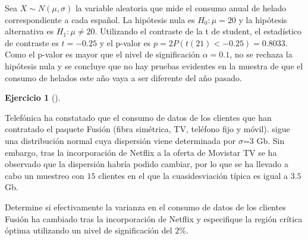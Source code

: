\documentclass[
  spanish,
  a4paper,
]{scrreport}
\theoremstyle{definition}
\newtheorem{exercise}{Ejercicio}[chapter]
\theoremstyle{remark}
\begin{document}
\begin{tcolorbox}[enhanced jigsaw, arc=.35mm, bottomrule=.15mm, bottomtitle=1mm, breakable, colback=white, colbacktitle=quarto-callout-tip-color!10!white, colframe=quarto-callout-tip-color-frame, coltitle=black, left=2mm, leftrule=.75mm, opacityback=0, opacitybacktitle=0.6, rightrule=.15mm, title=\textcolor{quarto-callout-tip-color}{\faLightbulb}\hspace{0.5em}{Solución}, titlerule=0mm, toprule=.15mm, toptitle=1mm]

Sea \(X\sim N(\mu,\sigma)\) la variable aleatoria que mide el consumo
anual de helado correspondiente a cada español. La hipótesis nula es
\(H_0: \mu=20\) y la hipótesis alternativa es \(H_1: \mu\neq 20\).
Utilizando el contraste de la t de student, el estadístico de contraste
es \(t=-0.25\) y el p-valor es \(p =2 P(t(21)<-0.25) = 0.8033\). Como el
p-valor es mayor que el nivel de significación \(\alpha = 0.1\), no se
rechaza la hipótesis nula y se concluye que no hay pruebas evidentes en
la muestra de que el consumo de helados este año vaya a ser diferente
del año pasado.

\end{tcolorbox}

\begin{exercise}[]\protect\hypertarget{exr-contraste-varianza-telefonica}{}\label{exr-contraste-varianza-telefonica}

Telefónica ha constatado que el consumo de datos de los clientes que han
contratado el paquete Fusión (fibra simétrica, TV, teléfono fijo y
móvil). sigue una distribución normal cuya dispersión viene determinada
por \(\sigma\)=\(3\) Gb. Sin embargo, tras la incorporación de Netflix a
la oferta de Movistar TV se ha observado que la dispersión habría podido
cambiar, por lo que se ha llevado a cabo un muestreo con \(15\) clientes
en el que la cuasidesviación típica es igual a \(3.5\) Gb.

Determine si efectivamente la varianza en el consumo de datos de los
clientes Fusión ha cambiado tras la incorporación de Netflix y
especifique la región crítica óptima utilizando un nivel de
significación del \(2\)\%.

\end{exercise}
\end{document}
